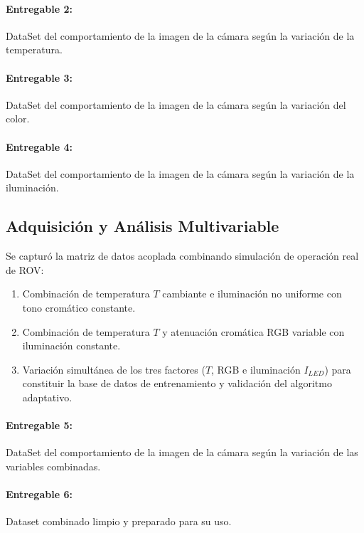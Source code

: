 \documentclass[12pt,letterpaper,spanish,twoside,openright]{report}
\begin{document}
\paragraph{Entregable 2:} DataSet del comportamiento de la imagen de la cámara según la variación de la temperatura.
\paragraph{Entregable 3:} DataSet del comportamiento de la imagen de la cámara según la variación del color.
\paragraph{Entregable 4:} DataSet del comportamiento de la imagen de la cámara según la variación de la iluminación.

\subsection{Adquisición y Análisis Multivariable}
Se capturó la matriz de datos acoplada combinando simulación de operación real de ROV:
\begin{enumerate}
    \item Combinación de temperatura $T$ cambiante e iluminación no uniforme con tono cromático constante.
    \item Combinación de temperatura $T$ y atenuación cromática RGB variable con iluminación constante.
    \item Variación simultánea de los tres factores ($T$, RGB e iluminación $I_{LED}$) para constituir la base de datos de entrenamiento y validación del algoritmo adaptativo.
\end{enumerate}

\paragraph{Entregable 5:} DataSet del comportamiento de la imagen de la cámara según la variación de las variables combinadas.
\paragraph{Entregable 6:} Dataset combinado limpio y preparado para su uso.
\end{document}
